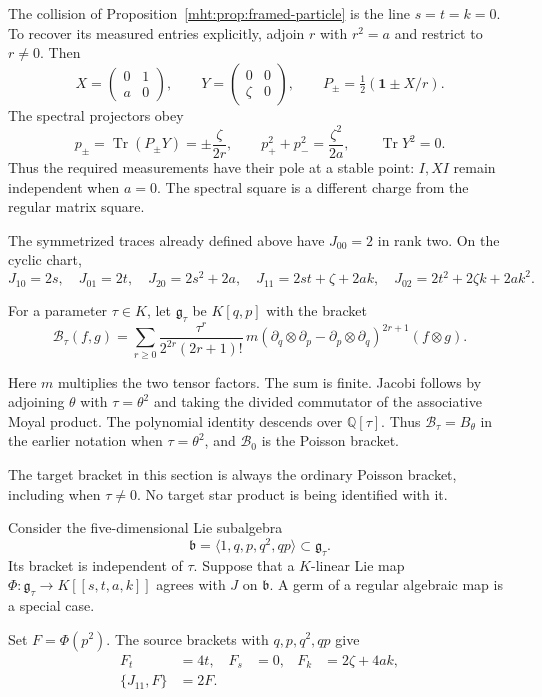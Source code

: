 The collision of Proposition~\ref{mht:prop:framed-particle} is the line $s=t=k=0$. To recover its
measured entries explicitly, adjoin $r$ with $r^2=a$ and restrict to
$r\ne0$. Then
\[
 X=\begin{pmatrix}0&1\\a&0\end{pmatrix},\qquad
 Y=\begin{pmatrix}0&0\\\zeta&0\end{pmatrix},\qquad
 P_\pm=\tfrac12(\mathbf1\pm X/r).
\]
The spectral projectors obey
\[
 p_\pm=\operatorname{Tr}(P_\pm Y)=\pm\frac{\zeta}{2r},
 \qquad p_+^2+p_-^2=\frac{\zeta^2}{2a},
 \qquad \operatorname{Tr}Y^2=0.
\]
Thus the required measurements have their pole at a stable point:
$I,XI$ remain independent when $a=0$. The spectral square is a
different charge from the regular matrix square.

The symmetrized traces already defined above have $J_{00}=2$
in rank two. On the cyclic chart,
\[
 J_{10}=2s,\quad J_{01}=2t,\quad J_{20}=2s^2+2a,
 \quad J_{11}=2st+\zeta+2ak,\quad
 J_{02}=2t^2+2\zeta k+2ak^2.
\]

For a parameter $\tau\in K$, let $\mathfrak g_\tau$ be $K[q,p]$ with
the bracket
\begin{equation}\label{mht:frgl:eq:moyal-tau}
 \mathcal B_\tau(f,g)=\sum_{r\geq0}
 \frac{\tau^r}{2^{2r}(2r+1)!}\,
 m\left(\partial_q\otimes\partial_p-
       \partial_p\otimes\partial_q\right)^{2r+1}(f\otimes g).
\end{equation}

Here $m$ multiplies the two tensor factors. The sum is finite. Jacobi follows by adjoining $\theta$ with $\tau=\theta^2$ and taking the divided commutator of the associative Moyal product. The polynomial identity descends over $\mathbb Q[\tau]$. Thus $\mathcal B_\tau=B_\theta$ in the earlier notation when
$\tau=\theta^2$, and $\mathcal B_0$ is the Poisson bracket.

The target bracket in this
section is always the ordinary Poisson bracket, including when
$\tau\ne0$. No target star product is being identified with it.

Consider the five-dimensional Lie subalgebra
\[
 \mathfrak b=\langle 1,q,p,q^2,qp\rangle\subset\mathfrak g_\tau.
\]
Its bracket is independent of $\tau$. Suppose that a $K$-linear Lie map
$\Phi:\mathfrak g_\tau\to K[[s,t,a,k]]$ agrees with $J$ on
$\mathfrak b$. A germ of a regular algebraic map is a special case.

Set $F=\Phi(p^2)$. The source brackets with $q,p,q^2,qp$ give
\begin{align*}
 F_t&=4t,&F_s&=0,&F_k&=2\zeta+4ak,\\
 \{J_{11},F\}&=2F.
\end{align*}

